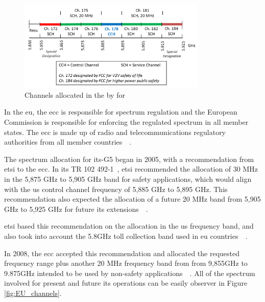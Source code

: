 \begin{figure}[htbp]
    \centering
    \includegraphics[width=0.8\textwidth]{Chapters/Figures/VANETs/WAVE_channels.png}
   	\caption{Channels allocated in the  by  for ~\cite{harri_multi-channel_2015}}
   	\label{fig:WAVE_channels}
\end{figure}

In the \gls{eu}, the \gls{ecc} is responsible for spectrum regulation and the European Commission is responsible for enforcing the regulated spectrum in all member states. The \gls{ecc} is made up of radio and telecommunications regulatory authorities from all member countries~\cite{harri_multi-channel_2015}~\cite{asselin-miller_study_2016}.

The spectrum allocation for \gls{its}-G5 began in 2005, with a recommendation from \gls{etsi} to the \gls{ecc}. In its TR 102 492-1~\cite{etsi_electromagnetic_2005}, \gls{etsi} recommended the allocation of 30 MHz in the 5,875 GHz to 5,905 GHz band for safety applications, which would align with the \gls{us} control channel frequency of 5,885 GHz to 5,895 GHz. This recommendation also expected the allocation of a future 20 MHz band from 5,905 GHz to 5,925 GHz for future \gls{its} extensions~\cite{harri_multi-channel_2015}~\cite{asselin-miller_study_2016}.

\gls{etsi} based this recommendation on the allocation in the \gls{us} frequency band, and also took into account the 5.8GHz toll collection band used in \gls{eu} countries~\cite{harri_multi-channel_2015}~\cite{asselin-miller_study_2016}.

In 2008, the \gls{ecc} accepted this recommendation and allocated the requested frequency range plus another 20 MHz frequency band from from 9,855GHz to 9.875GHz intended to be used by non-safety applications~\cite{harri_multi-channel_2015}~\cite{asselin-miller_study_2016}. All of the spectrum involved for present and future \gls{its} operations can be easily observer in Figure \ref{fig:EU_channels}.

